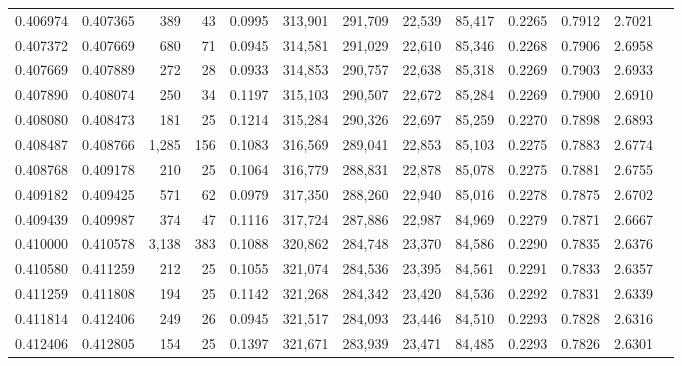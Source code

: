 \begin{tabular}{rrrrrrrrrrrrr}
0.406974 & 0.407365 &   389 &  43 &                                     0.0995 & 313,901 & 291,709 &  22,539 &  85,417 & 0.2265 & 0.7912 & 2.7021 \\
0.407372 & 0.407669 &   680 &  71 &                                     0.0945 & 314,581 & 291,029 &  22,610 &  85,346 & 0.2268 & 0.7906 & 2.6958 \\
0.407669 & 0.407889 &   272 &  28 &                                     0.0933 & 314,853 & 290,757 &  22,638 &  85,318 & 0.2269 & 0.7903 & 2.6933 \\
0.407890 & 0.408074 &   250 &  34 &                                     0.1197 & 315,103 & 290,507 &  22,672 &  85,284 & 0.2269 & 0.7900 & 2.6910 \\
0.408080 & 0.408473 &   181 &  25 &                                     0.1214 & 315,284 & 290,326 &  22,697 &  85,259 & 0.2270 & 0.7898 & 2.6893 \\
0.408487 & 0.408766 & 1,285 & 156 &                                     0.1083 & 316,569 & 289,041 &  22,853 &  85,103 & 0.2275 & 0.7883 & 2.6774 \\
0.408768 & 0.409178 &   210 &  25 &                                     0.1064 & 316,779 & 288,831 &  22,878 &  85,078 & 0.2275 & 0.7881 & 2.6755 \\
0.409182 & 0.409425 &   571 &  62 &                                     0.0979 & 317,350 & 288,260 &  22,940 &  85,016 & 0.2278 & 0.7875 & 2.6702 \\
0.409439 & 0.409987 &   374 &  47 &                                     0.1116 & 317,724 & 287,886 &  22,987 &  84,969 & 0.2279 & 0.7871 & 2.6667 \\
0.410000 & 0.410578 & 3,138 & 383 &                                     0.1088 & 320,862 & 284,748 &  23,370 &  84,586 & 0.2290 & 0.7835 & 2.6376 \\
0.410580 & 0.411259 &   212 &  25 &                                     0.1055 & 321,074 & 284,536 &  23,395 &  84,561 & 0.2291 & 0.7833 & 2.6357 \\
0.411259 & 0.411808 &   194 &  25 &                                     0.1142 & 321,268 & 284,342 &  23,420 &  84,536 & 0.2292 & 0.7831 & 2.6339 \\
0.411814 & 0.412406 &   249 &  26 &                                     0.0945 & 321,517 & 284,093 &  23,446 &  84,510 & 0.2293 & 0.7828 & 2.6316 \\
0.412406 & 0.412805 &   154 &  25 &                                     0.1397 & 321,671 & 283,939 &  23,471 &  84,485 & 0.2293 & 0.7826 & 2.6301 \\

\end{tabular}
